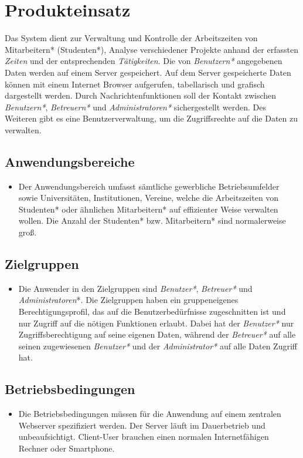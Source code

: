 \section{Produkteinsatz}
Das System dient zur Verwaltung und Kontrolle der Arbeitszeiten von Mitarbeitern* (Studenten*), Analyse verschiedener Projekte anhand der erfassten \emph{Zeiten} und der entsprechenden \emph{Tätigkeiten}.
Die von \emph{Benutzern*} angegebenen Daten werden auf einem Server gespeichert. Auf dem Server gespeicherte Daten können mit einem Internet Browser aufgerufen, tabellarisch und grafisch dargestellt werden.
Durch Nachrichtenfunktionen soll der Kontakt zwischen \emph{Benutzern*}, \emph{Betreuern*} und \emph{Administratoren*} sichergestellt werden.
Des Weiteren gibt es eine Benutzerverwaltung, um die Zugriffsrechte auf die Daten zu verwalten.
\subsection{Anwendungsbereiche}
\begin{itemize}
	\item Der Anwendungsbereich umfasst sämtliche gewerbliche Betriebsumfelder sowie Universitäten, Institutionen, Vereine,
	welche die Arbeitszeiten von Studenten* oder ähnlichen Mitarbeitern* auf effizienter Weise verwalten wollen. Die Anzahl der Studenten* bzw. Mitarbeitern* sind normalerweise groß.
\end{itemize}

\subsection{Zielgruppen}
\begin{itemize}
	\item Die Anwender in den Zielgruppen sind \emph{Benutzer*}, \emph{Betreuer*} und \emph{Administratoren}*.
	Die Zielgruppen haben ein gruppeneigenes Berechtigungsprofil, das auf die Benutzerbedürfnisse zugeschnitten ist und nur Zugriff auf die nötigen Funktionen erlaubt.
	Dabei hat der \emph{Benutzer*} nur Zugriffsberechtigung auf seine eigenen Daten, während der \emph{Betreuer*} auf alle seinen zugewiesenen \emph{Benutzer*} und der \emph{Administrator*} auf alle Daten Zugriff hat.
\end{itemize}

\subsection{Betriebsbedingungen}
\begin{itemize}
	\item Die Betriebsbedingungen müssen für die Anwendung auf einem zentralen Webserver spezifiziert werden. Der Server läuft im Dauerbetrieb und unbeaufsichtigt.
	Client-User brauchen einen normalen Internetfähigen Rechner oder Smartphone.
\end{itemize}
